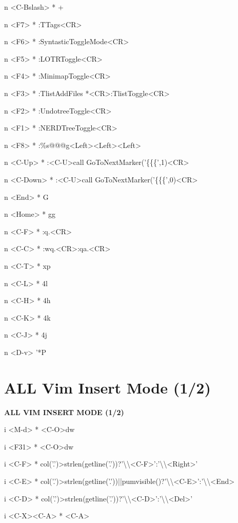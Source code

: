 \documentclass[11pt,a4paper,twoside]{book}
\begin{document}
n  <C-Bslash>  * +

n  <F7>  * :TTags<CR>

n  <F6>  * :SyntasticToggleMode<CR>

n  <F5>  * :LOTRToggle<CR>

n  <F4>  * :MinimapToggle<CR>

n  <F3>  * :TlistAddFiles *<CR>:TlistToggle<CR>

n  <F2>  * :UndotreeToggle<CR>

n  <F1>  * :NERDTreeToggle<CR>

n  <F8>  * :\%s@@@g<Left><Left><Left>

n  <C-Up>  * :<C-U>call GoToNextMarker('\{\{\{',1)<CR>

n  <C-Down>  * :<C-U>call GoToNextMarker('\{\{\{',0)<CR>

n  <End>  * G

n  <Home>  * gg

n  <C-F>  * :q.<CR>

n  <C-C>  * :wq.<CR>:qa.<CR>

n  <C-T>  * xp

n  <C-L>  * 4l

n  <C-H>  * 4h

n  <C-K>  * 4k

n  <C-J>  * 4j

n  <D-v>  '*P


\vspace{16pt}

\section{ALL Vim Insert Mode (1/2)}


\vspace{10pt}
{\large\bfseries\color{neoncyan} ALL VIM INSERT MODE (1/2)}\vspace{6pt}

i  <M-d>  * <C-O>dw

i  <F31>  * <C-O>dw

i  <C-F>  * col('.')>strlen(getline('.'))?'\textbackslash{}\textbackslash{}<C-F>':'\textbackslash{}\textbackslash{}<Right>'

i  <C-E>  * col('.')>strlen(getline('.'))||pumvisible()?'\textbackslash{}\textbackslash{}<C-E>':'\textbackslash{}\textbackslash{}<End>

i  <C-D>  * col('.')>strlen(getline('.'))?'\textbackslash{}\textbackslash{}<C-D>':'\textbackslash{}\textbackslash{}<Del>'

i  <C-X><C-A>  * <C-A>
\end{document}
